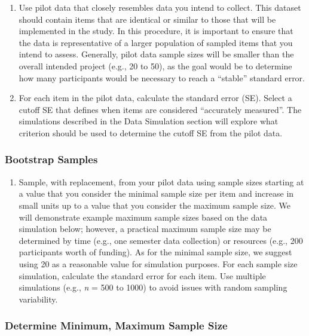 \documentclass[
  man]{apa7}
\providecommand{\tightlist}{%
  \setlength{\itemsep}{0pt}\setlength{\parskip}{0pt}}
\begin{document}
\begin{enumerate}
\def\labelenumi{\arabic{enumi})}
\item
  Use pilot data that closely resembles data you intend to collect. This dataset should contain items that are identical or similar to those that will be implemented in the study. In this procedure, it is important to ensure that the data is representative of a larger population of sampled items that you intend to assess. Generally, pilot data sample sizes will be smaller than the overall intended project (e.g., 20 to 50), as the goal would be to determine how many participants would be necessary to reach a ``stable'' standard error.
\item
  For each item in the pilot data, calculate the standard error (SE). Select a cutoff SE that defines when items are considered ``accurately measured''. The simulations described in the Data Simulation section will explore what criterion should be used to determine the cutoff SE from the pilot data.
\end{enumerate}

\hypertarget{bootstrap-samples}{%
\subsubsection{Bootstrap Samples}\label{bootstrap-samples}}

\begin{enumerate}
\def\labelenumi{\arabic{enumi})}
\setcounter{enumi}{2}
\tightlist
\item
  Sample, with replacement, from your pilot data using sample sizes starting at a value that you consider the minimal sample size per item and increase in small units up to a value that you consider the maximum sample size. We will demonstrate example maximum sample sizes based on the data simulation below; however, a practical maximum sample size may be determined by time (e.g., one semester data collection) or resources (e.g., 200 participants worth of funding). As for the minimal sample size, we suggest using 20 as a reasonable value for simulation purposes. For each sample size simulation, calculate the standard error for each item. Use multiple simulations (e.g., \emph{n} = 500 to 1000) to avoid issues with random sampling variability.
\end{enumerate}

\hypertarget{determine-minimum-maximum-sample-size}{%
\subsubsection{Determine Minimum, Maximum Sample Size}\label{determine-minimum-maximum-sample-size}}
\end{document}
